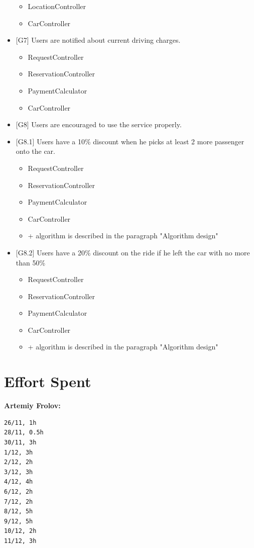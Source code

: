 \documentclass[12pt, letterpaper]{article}
\begin{document}
\begin{itemize}
\begin{itemize}
		\item LocationController
		\item CarController
	\end{itemize}
	\item {[G7]} Users are notified about current driving charges.
	\begin{itemize}
		\item RequestController
		\item ReservationController
		\item PaymentCalculator
		\item CarController
	\end{itemize}
	\item {[G8]} Users are encouraged to use the service properly.
	\item {[G8.1]} Users have a 10\% discount when he picks at least 2 more passenger onto the car.
	\begin{itemize}
		\item RequestController
		\item ReservationController
		\item PaymentCalculator
		\item CarController
		\item + algorithm is described in the paragraph "Algorithm design"
	\end{itemize}
	\item {[G8.2]} Users have a 20\% discount on the ride if he left the car with no more than 50\%
	\begin{itemize}
		\item RequestController
		\item ReservationController
		\item PaymentCalculator
		\item CarController
		\item + algorithm is described in the paragraph "Algorithm design"
	\end{itemize}
\end{itemize}

\newpage
\section {Effort Spent} 
\textbf{Artemiy Frolov:}
\begin{verbatim}
26/11, 1h
28/11, 0.5h
30/11, 3h
1/12, 3h
2/12, 2h
3/12, 3h
4/12, 4h
6/12, 2h
7/12, 2h
8/12, 5h
9/12, 5h
10/12, 2h
11/12, 3h
\end{verbatim} 
\end{document}
